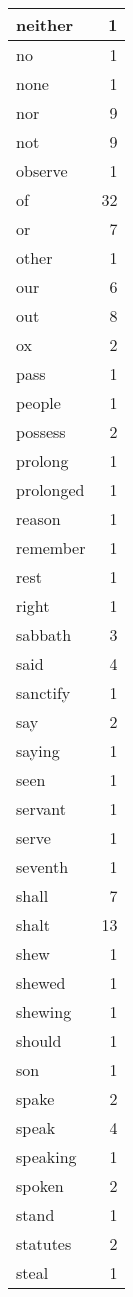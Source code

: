 \begin{center}
\begin{longtable}{l|r}
neither & 1 \\ \hline
no & 1 \\ \hline
none & 1 \\ \hline
nor & 9 \\ \hline
not & 9 \\ \hline
observe & 1 \\ \hline
of & 32 \\ \hline
or & 7 \\ \hline
other & 1 \\ \hline
our & 6 \\ \hline
out & 8 \\ \hline
ox & 2 \\ \hline
pass & 1 \\ \hline
people & 1 \\ \hline
possess & 2 \\ \hline
prolong & 1 \\ \hline
prolonged & 1 \\ \hline
reason & 1 \\ \hline
remember & 1 \\ \hline
rest & 1 \\ \hline
right & 1 \\ \hline
sabbath & 3 \\ \hline
said & 4 \\ \hline
sanctify & 1 \\ \hline
say & 2 \\ \hline
saying & 1 \\ \hline
seen & 1 \\ \hline
servant & 1 \\ \hline
serve & 1 \\ \hline
seventh & 1 \\ \hline
shall & 7 \\ \hline
shalt & 13 \\ \hline
shew & 1 \\ \hline
shewed & 1 \\ \hline
shewing & 1 \\ \hline
should & 1 \\ \hline
son & 1 \\ \hline
spake & 2 \\ \hline
speak & 4 \\ \hline
speaking & 1 \\ \hline
spoken & 2 \\ \hline
stand & 1 \\ \hline
statutes & 2 \\ \hline
steal & 1 \\ \hline

\end{longtable}
\end{center}
